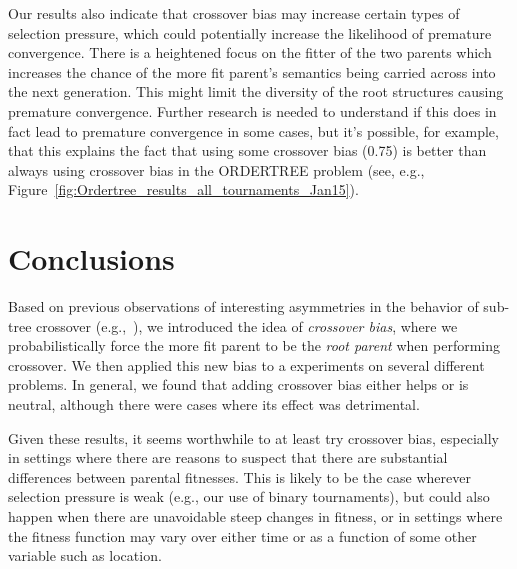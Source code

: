 \documentclass{sig-alternate}
\begin{document}
Our results also indicate that crossover bias may increase certain types of selection pressure, which could potentially
increase the likelihood of premature convergence.
There is a heightened focus on the fitter of the two parents which increases the chance of the more fit parent's
semantics being carried across into the next generation. This might limit the diversity of the root structures causing
premature convergence. Further research is needed to understand if this does in fact lead to premature convergence in
some cases, but it's possible, for example, that this explains the fact that using some crossover bias (0.75) is better
than always using crossover bias in the ORDERTREE problem (see, e.g.,
Figure~\ref{fig:Ordertree_results_all_tournaments_Jan15}).


\section{Conclusions} \label{sec:Conclusions}

Based on previous observations of interesting asymmetries in the behavior of sub-tree crossover
(e.g.,~\cite{McPheeDonatucciDramdahl:2014}), we introduced the idea of \emph{crossover bias}, where we
probabilistically force the more fit parent to be the \emph{root parent} when performing crossover. We then applied
this new bias to a experiments on several different problems. In general, we found that adding crossover bias either
helps or is neutral, although there were cases where its effect was detrimental.

Given these results, it seems worthwhile to at least try crossover bias, especially in settings where there are reasons
to suspect that there are substantial differences between parental fitnesses. This is likely to be the case wherever
selection pressure is weak (e.g., our use of binary tournaments), but could also happen when there are unavoidable
steep changes in fitness, or in settings where the fitness function may vary over either time or as a function of some
other variable such as location.
\end{document}
